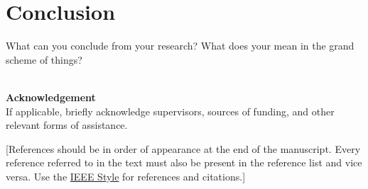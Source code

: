 \documentclass[11pt,a4paper, final, twoside]{article}
\theoremstyle{proposition}
\theoremstyle{definition}
\theoremstyle{remark}
\numberwithin{equation}{section}
\begin{document}
\section{Conclusion}
What can you conclude from your research? What does your mean in the grand scheme of things? 

\mbox{}\\

\noindent \Large\textbf{Acknowledgement}\\[1mm] 

\normalsize \noindent If applicable, briefly acknowledge supervisors, sources of funding, and other relevant forms of assistance.\\[3mm]

\cite{reference-key-a}
\cite{reference-key-b}
\newline

[References should be in order of appearance at the end of the manuscript. Every reference referred to in the text must also be present in the reference list and vice versa. Use the \href{http://www.ieee.org/documents/ieeecitationref.pdf}{IEEE Style} for references and citations.]



\end{document}
